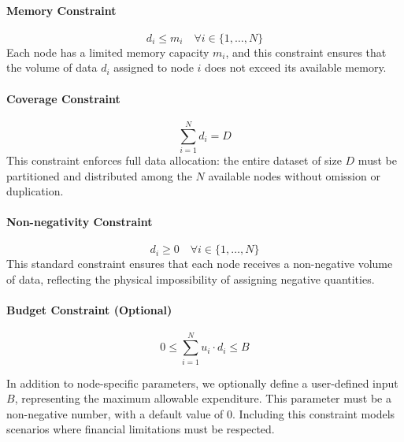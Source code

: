 \documentclass[]{interact}
\theoremstyle{plain}
\theoremstyle{definition}
\theoremstyle{remark}
\begin{document}
\paragraph{Memory Constraint}
\begin{equation}
    d_i \leq m_i \quad \forall i \in \{1, \ldots, N\}
\end{equation}
Each node has a limited memory capacity $m_i$, and this constraint ensures that the volume of data $d_i$ assigned to node $i$ does not exceed its available memory.

\paragraph{Coverage Constraint}
\begin{equation}
    \sum_{i=1}^{N} d_i = D
\end{equation}
This constraint enforces full data allocation: the entire dataset of size $D$ must be partitioned and distributed among the $N$ available nodes without omission or duplication.

\paragraph{Non-negativity Constraint}
\begin{equation}
    d_i \geq 0 \quad \forall i \in \{1, \ldots, N\}
\end{equation}
This standard constraint ensures that each node receives a non-negative volume of data, reflecting the physical impossibility of assigning negative quantities.


\paragraph{Budget Constraint (Optional)}
\begin{equation}
    0 \leq \sum_{i=1}^{N} u_i \cdot d_i \leq B
\end{equation}

In addition to node-specific parameters, we optionally define a user-defined input $B$, representing the maximum allowable expenditure. This parameter must be a non-negative number, with a default value of $0$. Including this constraint models scenarios where financial limitations must be respected.



\end{document}
